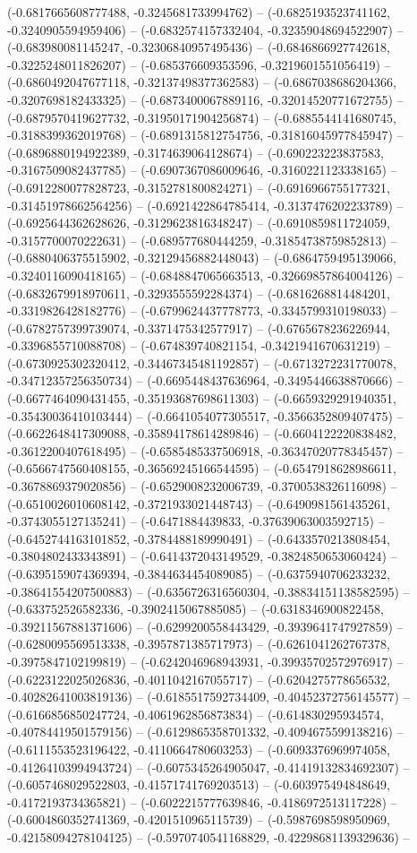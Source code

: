 (-0.6817665608777488, -0.3245681733994762) -- (-0.6825193523741162, -0.3240905594959406) -- (-0.6832574157332404, -0.32359048694522907) -- (-0.683980081145247, -0.32306840957495436) -- (-0.6846866927742618, -0.3225248011826207) -- (-0.685376609353596, -0.3219601551056419) -- (-0.6860492047677118, -0.32137498377362583) -- (-0.6867038686204366, -0.3207698182433325) -- (-0.6873400067889116, -0.32014520771672755) -- (-0.6879570419627732, -0.31950171904256874) -- (-0.6885544141680745, -0.3188399362019768) -- (-0.6891315812754756, -0.31816045977845947) -- (-0.6896880194922389, -0.3174639064128674) -- (-0.690223223837583, -0.3167509082437785) -- (-0.6907367086009646, -0.3160221123338165) -- (-0.6912280077828723, -0.3152781800824271) -- (-0.6916966755177321, -0.31451978662564256) -- (-0.6921422864785414, -0.3137476202233789) -- (-0.6925644362628626, -0.3129623816348247) -- (-0.6910859811724059, -0.3157700070222631) -- (-0.689577680444259, -0.31854738759852813) -- (-0.6880406375515902, -0.32129456882448043) -- (-0.6864759495139066, -0.3240116090418165) -- (-0.6848847065663513, -0.32669857864004126) -- (-0.6832679918970611, -0.3293555592284374) -- (-0.6816268814484201, -0.3319826428182776) -- (-0.6799624437778773, -0.3345799310198033) -- (-0.6782757399739074, -0.3371475342577917) -- (-0.6765678236226944, -0.3396855710088708) -- (-0.674839740821154, -0.3421941670631219) -- (-0.6730925302320412, -0.34467345481192857) -- (-0.6713272231770078, -0.34712357256350734) -- (-0.6695448437636964, -0.3495446638870666) -- (-0.6677464090431455, -0.35193687698611303) -- (-0.6659329291940351, -0.35430036410103444) -- (-0.6641054077305517, -0.3566352809407475) -- (-0.6622648417309088, -0.35894178614289846) -- (-0.6604122220838482, -0.3612200407618495) -- (-0.6585485337506918, -0.36347020778345457) -- (-0.6566747560408155, -0.36569245166544595) -- (-0.6547918628986611, -0.3678869379020856) -- (-0.6529008232006739, -0.3700538326116098) -- (-0.6510026010608142, -0.3721933021448743) -- (-0.6490981561435261, -0.3743055127135241) -- (-0.6471884439833, -0.37639063003592715) -- (-0.6452744163101852, -0.3784488189990491) -- (-0.6433570213808454, -0.3804802433343891) -- (-0.6414372043149529, -0.3824850653060424) -- (-0.6395159074369394, -0.3844634454089085) -- (-0.6375940706233232, -0.38641554207500883) -- (-0.6356726316560304, -0.38834151138582595) -- (-0.633752526582336, -0.3902415067885085) -- (-0.6318346900822458, -0.39211567881371606) -- (-0.6299200558443429, -0.3939641747927859) -- (-0.6280095569513338, -0.3957871385717973) -- (-0.6261041262767378, -0.3975847102199819) -- (-0.6242046968943931, -0.39935702572976917) -- (-0.6223122025026836, -0.4011042167055717) -- (-0.6204275778656532, -0.40282641003819136) -- (-0.6185517592734409, -0.40452372756145577) -- (-0.6166856850247724, -0.4061962856873834) -- (-0.614830295934574, -0.40784419501579156) -- (-0.6129865358701332, -0.4094675599138216) -- (-0.6111553523196422, -0.4110664780603253) -- (-0.6093376969974058, -0.41264103994943724) -- (-0.6075345264905047, -0.41419132834692307) -- (-0.6057468029522803, -0.41571741769203513) -- (-0.603975494848649, -0.4172193734365821) -- (-0.6022215777639846, -0.4186972513117228) -- (-0.6004860352741369, -0.4201510965115739) -- (-0.5987698598950969, -0.42158094278104125) -- (-0.5970740541168829, -0.42298681139329636) -- 
